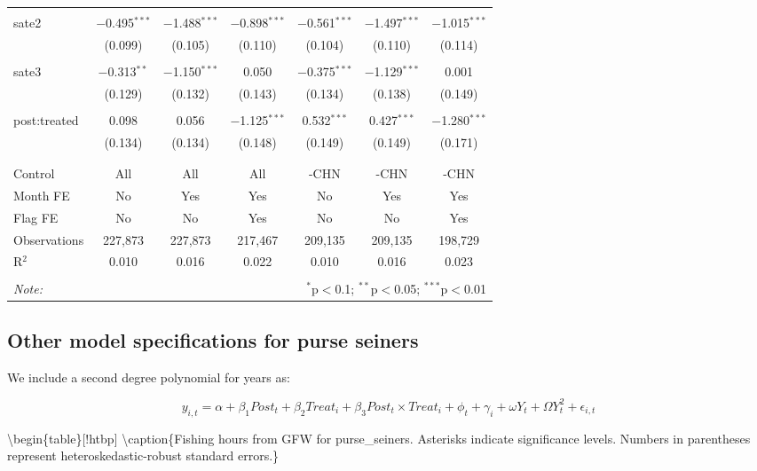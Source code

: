 \documentclass[11pt,]{article}
\begin{document}
\begin{table}[!htbp]
\begin{tabular}{@{\extracolsep{1pt}}lcccccc}
  & & & & & & \\ 
 sate2 & $-$0.495$^{***}$ & $-$1.488$^{***}$ & $-$0.898$^{***}$ & $-$0.561$^{***}$ & $-$1.497$^{***}$ & $-$1.015$^{***}$ \\ 
  & (0.099) & (0.105) & (0.110) & (0.104) & (0.110) & (0.114) \\ 
  & & & & & & \\ 
 sate3 & $-$0.313$^{**}$ & $-$1.150$^{***}$ & 0.050 & $-$0.375$^{***}$ & $-$1.129$^{***}$ & 0.001 \\ 
  & (0.129) & (0.132) & (0.143) & (0.134) & (0.138) & (0.149) \\ 
  & & & & & & \\ 
 post:treated & 0.098 & 0.056 & $-$1.125$^{***}$ & 0.532$^{***}$ & 0.427$^{***}$ & $-$1.280$^{***}$ \\ 
  & (0.134) & (0.134) & (0.148) & (0.149) & (0.149) & (0.171) \\ 
  & & & & & & \\ 
\hline \\[-1.8ex] 
Control & All & All & All & -CHN & -CHN & -CHN \\ 
Month FE & No & Yes & Yes & No & Yes & Yes \\ 
Flag FE & No & No & Yes & No & No & Yes \\ 
Observations & 227,873 & 227,873 & 217,467 & 209,135 & 209,135 & 198,729 \\ 
R$^{2}$ & 0.010 & 0.016 & 0.022 & 0.010 & 0.016 & 0.023 \\ 
\hline 
\hline \\[-1.8ex] 
\textit{Note:}  & \multicolumn{6}{r}{$^{*}$p$<$0.1; $^{**}$p$<$0.05; $^{***}$p$<$0.01} \\ 
\end{tabular} 
\end{table}

\clearpage

\hypertarget{other-model-specifications-for-purse-seiners}{%
\subsection{Other model specifications for purse
seiners}\label{other-model-specifications-for-purse-seiners}}

We include a second degree polynomial for years as:

\[
y_{i,t} = \alpha + \beta_1 Post_t + \beta_2 Treat_i + \beta_3 Post_t \times Treat_i + \phi_t + \gamma_i + \omega Y_t + \Omega Y_t^2 + \epsilon_{i,t}
\]

\textbackslash{}begin\{table\}{[}!htbp{]} \centering 
\textbackslash{}caption\{\label{tab:purse}Fishing hours from GFW for
purse\_seiners. Asterisks indicate significance levels. Numbers in
parentheses represent heteroskedastic-robust standard errors.\} \label{}
\end{document}
